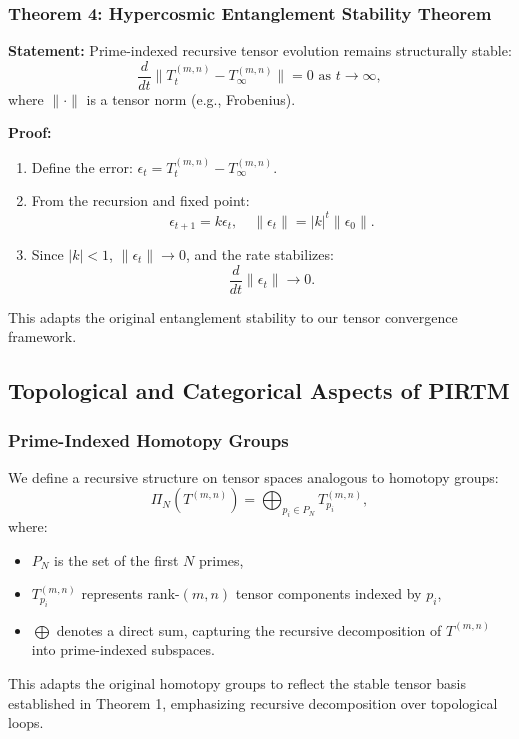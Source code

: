 \documentclass[12pt]{article}
\begin{document}
\subsubsection{Theorem 4: Hypercosmic Entanglement Stability Theorem}
\textbf{Statement:} Prime-indexed recursive tensor evolution remains structurally stable:
\begin{equation}
    \frac{d}{dt} \| T_t^{(m,n)} - T_\infty^{(m,n)} \| = 0 \text{ as } t \to \infty,
\end{equation}
where \( \| \cdot \| \) is a tensor norm (e.g., Frobenius).

\textbf{Proof:}
\begin{enumerate}
    \item Define the error: \( \epsilon_t = T_t^{(m,n)} - T_\infty^{(m,n)} \).
    \item From the recursion and fixed point:
    \[
    \epsilon_{t+1} = k \epsilon_t, \quad \|\epsilon_t\| = |k|^t \|\epsilon_0\|.
    \]
    \item Since \( |k| < 1 \), \( \|\epsilon_t\| \to 0 \), and the rate stabilizes:
    \[
    \frac{d}{dt} \|\epsilon_t\| \to 0.
    \]
\end{enumerate}
This adapts the original entanglement stability to our tensor convergence framework.
\subsection{Topological and Categorical Aspects of PIRTM}

\subsubsection{Prime-Indexed Homotopy Groups}
We define a recursive structure on tensor spaces analogous to homotopy groups:
\begin{equation}
    \Pi_N(T^{(m,n)}) = \bigoplus_{p_i \in P_N} T_{p_i}^{(m,n)},
\end{equation}
where:
\begin{itemize}
    \item \( P_N \) is the set of the first \( N \) primes,
    \item \( T_{p_i}^{(m,n)} \) represents rank-$(m,n)$ tensor components indexed by \( p_i \),
    \item \( \bigoplus \) denotes a direct sum, capturing the recursive decomposition of \( T^{(m,n)} \) into prime-indexed subspaces.
\end{itemize}
This adapts the original homotopy groups to reflect the stable tensor basis established in Theorem 1, emphasizing recursive decomposition over topological loops.
\end{document}
